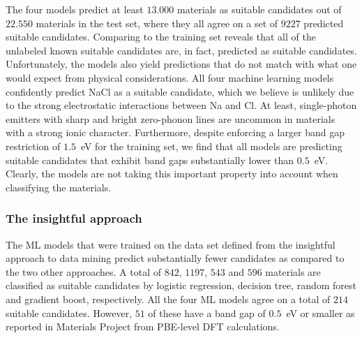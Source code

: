 \documentclass[superscriptaddress,unsortedaddress,
 amsmath,amssymb,
 aps,
]{revtex4-2}
\begin{document}
The four models predict at least $13.000$ materials as suitable candidates out of $22.550$ materials in the test set, where they all agree on a set of $9227$ predicted suitable candidates. Comparing to the training set reveals that all of the unlabeled known suitable candidates are, in fact, predicted as suitable candidates. Unfortunately, the models also yield predictions that do not match with what one would expect from physical considerations. 
All four machine learning models confidently predict NaCl as a suitable candidate, which we believe is unlikely due to the strong electrostatic interactions between Na and Cl. 
At least, single-photon emitters with sharp and bright zero-phonon lines are uncommon in materials with a strong ionic character. 
Furthermore, despite enforcing a larger band gap restriction of $1.5$~eV for the training set, we find that all models are predicting suitable candidates that exhibit band gaps substantially lower than $0.5$~eV.
Clearly, the models are not taking this important property into account when classifying the materials. 
 
\subsubsection*{The insightful approach}
The ML models that were trained on the data set defined from the insightful approach to data mining predict substantially fewer candidates as compared to the two other approaches. 
A total of $842$, $1197$, $543$ and $596$ materials are classified as suitable candidates by logistic regression, decision tree, random forest and gradient boost, respectively. All the four ML models agree on a total of $214$ suitable candidates. However, $51$ of these have a band gap of $0.5$~eV or smaller as reported in Materials Project from PBE-level DFT calculations.  

\end{document}
